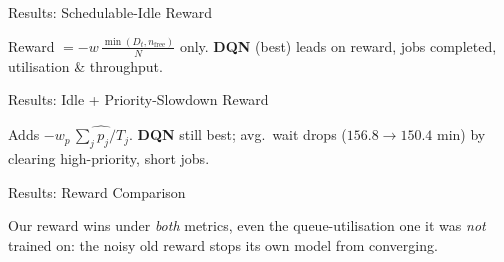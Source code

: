 \begin{frame}{Results: Schedulable-Idle Reward}
  \centering

  \vspace{1em}
  \small\textcolor{DeepBlue}{Reward $= -w\,\tfrac{\min(D_t, n_{\text{free}})}{N}$ only. \;
  \textbf{DQN} (best) leads on reward, jobs completed, utilisation \& throughput.}
\end{frame}

\begin{frame}{Results: Idle + Priority-Slowdown Reward}
  \centering

  \vspace{1em}
  \small\textcolor{DeepBlue}{Adds $-w_p\,\widehat{\sum_j p_j/T_j}$. \;
  \textbf{DQN} still best; avg.\ wait drops ($156.8\!\to\!150.4$ min) by clearing high-priority, short jobs.}
\end{frame}

\begin{frame}{Results: Reward Comparison}
  \centering

  \vspace{0.2em}
  \small\textcolor{DeepBlue}{Our reward wins under \emph{both} metrics, even the queue-utilisation one it was \emph{not} trained on: the noisy old reward stops its own model from converging.}
\end{frame}
